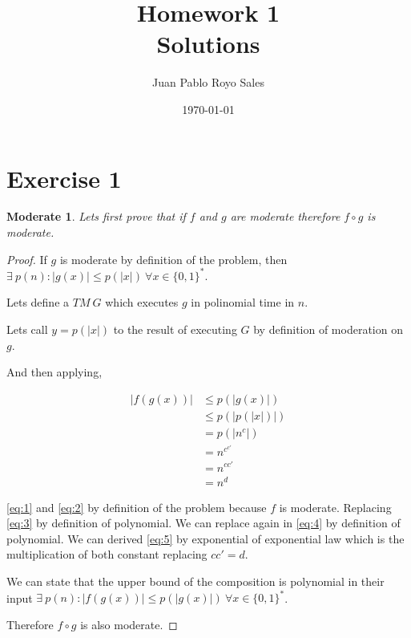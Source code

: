 \documentclass[12pt, a4paper]{article}
\title{%
      Homework 1 \\
      Solutions
}
\author{Juan Pablo Royo Sales}
\date\today
\begin{document}
\maketitle

\section{Exercise 1}
\newtheorem{moderate}{Moderate}
\begin{moderate}
Lets first prove that if $f$ and $g$ are moderate therefore $f \circ g$ is moderate.
\end{moderate}

\begin{proof}
  If $g$ is moderate by definition of the problem, then $\exists\ p(n): |g(x)| \leq p(|x|)\ \forall x \in \{0,1\}^*$.

  Lets define a $TM\ G$ which executes $g$ in polinomial time in $n$.

  Lets call $y = p(|x|)$ to the result of executing $G$ by definition of moderation on $g$.

  And then applying,

  \begin{subequations}
    \begin{align}
      |f(g(x))| &\leq p(|g(x)|) \label{eq:1} \\
                &\leq p(|p(|x|)|) \label{eq:2}\\
                &= p(|n^c|) \label{eq:3} \\
                &= n^{c^{c'}} \label{eq:4} \\
                &= n^{cc'} \label{eq:5} \\
                &= n^d
    \end{align}
  \end{subequations}

  \ref{eq:1} and \ref{eq:2} by definition of the problem because $f$ is moderate.
  Replacing \ref{eq:3} by definition of polynomial. We can replace again in \ref{eq:4} by definition of polynomial. We can derived \ref{eq:5} by exponential of exponential law which is the multiplication of both constant replacing $c{c'} = d$.

  We can state that the upper bound of the composition is polynomial in their input $\exists\ p(n): |f(g(x))| \leq p(|g(x)|)\ \forall x \in \{0,1\}^*$.

  Therefore $f \circ g$ is also moderate.
\end{proof}
\end{document}
